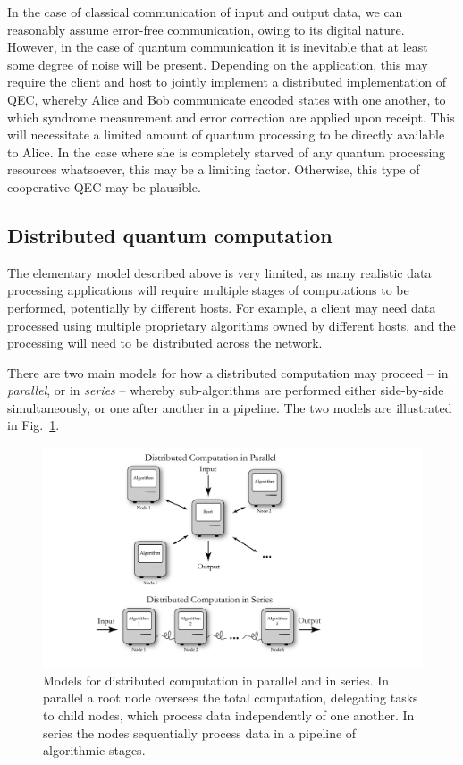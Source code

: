 \documentclass[aps,rmp,twocolumn,amsmath,amssymb,nofootinbib,superscriptaddress]{revtex4}
\begin{document}
In the case of classical communication of input and output data, we can reasonably assume error-free communication, owing to its digital nature. However, in the case of quantum communication it is inevitable that at least some degree of noise will be present. Depending on the application, this may require the client and host to jointly implement a distributed implementation of QEC, whereby Alice and Bob communicate encoded states with one another, to which syndrome measurement and error correction are applied upon receipt. This will necessitate a limited amount of quantum processing to be directly available to Alice. In the case where she is completely starved of any quantum processing resources whatsoever, this may be a limiting factor. Otherwise, this type of cooperative QEC may be plausible.

%
%

\subsection{Distributed quantum computation} \label{sec:dist_QC}

The elementary model described above is very limited, as many realistic data processing applications will require multiple stages of computations to be performed, potentially by different hosts. For example, a client may need data processed using multiple proprietary algorithms owned by different hosts, and the processing will need to be distributed across the network.

There are two main models for how a distributed computation may proceed -- in \emph{parallel}, or in \emph{series} -- whereby sub-algorithms are performed either side-by-side simultaneously, or one after another in a pipeline. The two models are illustrated in Fig.~\ref{fig:distributed}.

\begin{figure}[!htb]
\includegraphics[width=\columnwidth]{distributed}
\caption{Models for distributed computation in parallel and in series. In parallel a root node oversees the total computation, delegating tasks to child nodes, which process data independently of one another. In series the nodes sequentially process data in a pipeline of algorithmic stages.} \label{fig:distributed}
\end{figure}
\end{document}
